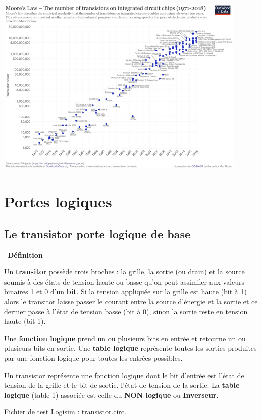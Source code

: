 \documentclass[
  11pt,
]{article}
\newcounter{def}
\newenvironment{definition}[1]
{\par \medskip   \addtocounter{def}{1} \noindent  
\begin{bclogo}[arrondi =0.1,  ombre = true, barre=none, logo=\bcbook, marge=4]{~\textbf{Définition} \textbf{\thedef} {\itshape #1} }  \par}
{
\end{bclogo}
 \par \bigskip }
\newcounter{logi}
\begin{document}
\begin{center}{}

\includegraphics[width=0.9\textwidth,height=\textheight]{images/640px-Moores_Law_Transistor_Count_1971-2018.png}\\

\end{center}

\hypertarget{portes-logiques}{%
\section{Portes logiques}\label{portes-logiques}}

\hypertarget{le-transistor-porte-logique-de-base}{%
\subsection{Le transistor porte logique de
base}\label{le-transistor-porte-logique-de-base}}

\begin{definition}{}

Un \textbf{transitor} possède trois broches : la grille, la sortie (ou
drain) et la source soumis à des états de tension haute ou basse qu'on
peut assimiler aux valeurs binaires 1 et 0 d'un \textbf{bit}. Si la
tension appliquée sur la grille est haute (bit à 1) alors le transitor
laisse passer le courant entre la source d'énergie et la sortie et ce
dernier passe à l'état de tension basse (bit à 0), sinon la sortie reste
en tension haute (bit 1).

Une \textbf{fonction logique} prend un ou plusieurs bits en entrée et
retourne un ou plusieurs bits en sortie. Une \textbf{table logique}
représente toutes les sorties produites par une fonction logique pour
toutes les entrées possibles.

Un transistor représente une fonction logique dont le bit d'entrée est
l'état de tension de la grille et le bit de sortie, l'état de tension de
la sortie. La \textbf{table logique} (table 1) associée est celle du
\textbf{NON logique} ou \textbf{Inverseur}.

Fichier de test \href{http://www.cburch.com/logisim/}{Logisim} :
\href{circuits_logisim/transistor.circ}{transistor.circ}.

\end{definition}
\end{document}
